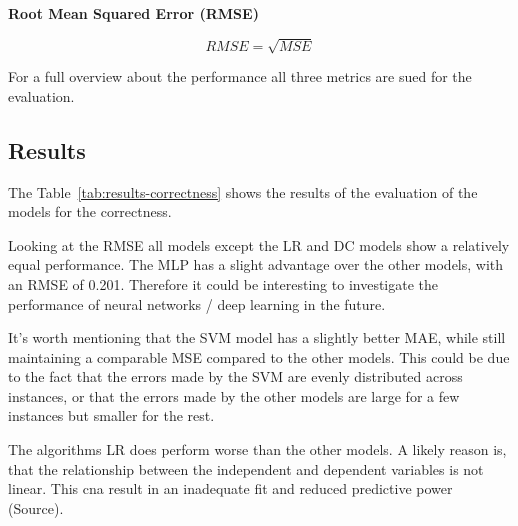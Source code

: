 \textbf{Root Mean Squared Error (RMSE)}

\begin{tcolorbox}[arc=0pt,boxrule=0.5pt]
    \begin{equation}
        \label{eq:rmse}
        RMSE = \sqrt{MSE}
    \end{equation}
\end{tcolorbox}

For a full overview about the performance all three metrics are sued for the
evaluation.




\subsection{Results}\label{subsec:results}
The Table~\ref{tab:results-correctness} shows the results of the
evaluation of the models for the correctness.

Looking at the \ac{RMSE} all models except the \ac{LR} and \ac{DC} models show a
relatively equal performance.
The \ac{MLP} has a slight advantage over the other models, with an \ac{RMSE} of 0.201.
Therefore it could be interesting to investigate the performance of neural networks /
deep learning in the future.

It's worth mentioning that the \ac{SVM} model has a slightly better \ac{MAE}, while
still maintaining a comparable \ac{MSE} compared to the other models.
This could be due to the fact that the errors made by the \ac{SVM} are evenly
distributed across instances, or that the errors made by the other models are large for
a few instances but smaller for the rest.

The algorithms \ac{LR} does perform worse than the other models.
A likely reason is, that the relationship between the independent and dependent
variables is not linear.
This cna result in an inadequate fit and reduced predictive power (Source).


